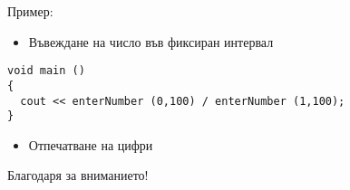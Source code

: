 \documentclass{beamer}
\begin{document}
\begin{frame}[fragile]
\centerline{Пример:}
\begin{itemize}
  \item Въвеждане на число във фиксиран интервал
\end{itemize}

\begin{flushleft}
\begin{lstlisting}
void main ()
{
  cout << enterNumber (0,100) / enterNumber (1,100);
}
\end{lstlisting}

\end{flushleft}

\begin{itemize}
  \item Отпечатване на цифри
\end{itemize}


\end{frame}



\begin{frame}
\centerline{Благодаря за вниманието!}
\end{frame}
\end{document}
